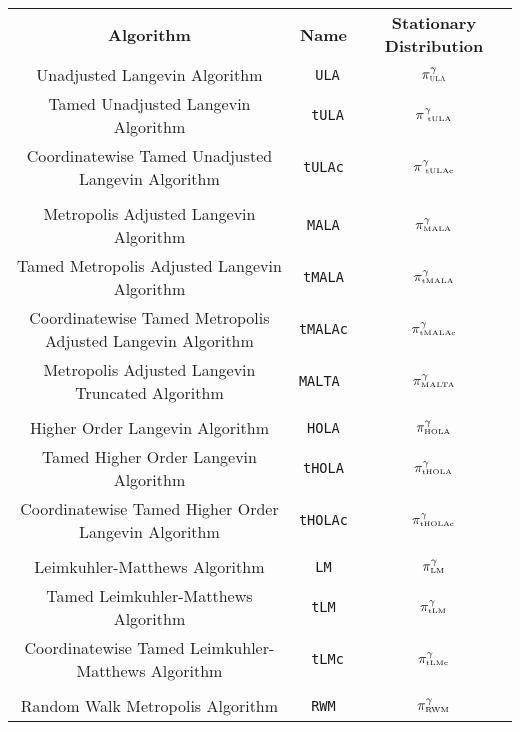 \documentclass[a4paper]{article}
\theoremstyle{definition}
\begin{document}
\bgroup
\def\arraystretch{1.25}
\begin{center}
\begin{tabular}{ccc}
	\textbf{Algorithm} & \textbf{Name} & \textbf{Stationary Distribution} \\ 
	Unadjusted Langevin Algorithm &\texttt{ ULA} & \(\pi^{\gamma}_{\text{\tiny  \sc ULA}}\)\\ 
	Tamed Unadjusted Langevin Algorithm &\texttt{ tULA} & \(\pi^{\gamma}_{\text{ \tiny   tULA}}\) \\ 
	Coordinatewise Tamed Unadjusted Langevin Algorithm & \texttt{\tiny tULAc} & \(\pi^{\gamma}_{\text{ \tiny tULAc}}\) \\ 
	&  \\ 
	Metropolis Adjusted Langevin Algorithm & \texttt{MALA} & \(\pi^{\gamma}_{\text{\tiny MALA}}\) \\ 
	Tamed Metropolis Adjusted Langevin Algorithm & \texttt{tMALA} & \(\pi^{\gamma}_{\text{\tiny tMALA}}\) \\ 
	Coordinatewise Tamed Metropolis Adjusted Langevin Algorithm & \texttt{\tiny tMALAc} & \(\pi^{\gamma}_{\text{\tiny tMALAc}}\) \\ 
	Metropolis Adjusted Langevin Truncated  Algorithm & \texttt{MALTA } & \(\pi^{\gamma}_{\text{\tiny MALTA}}\)\\ 
	&  \\ 
	Higher Order Langevin Algorithm & \texttt{HOLA} & \(\pi^{\gamma}_{\text{\tiny HOLA}}\) \\ 
	Tamed Higher Order Langevin Algorithm & \texttt{tHOLA}  & \(\pi^{\gamma}_{\text{\tiny tHOLA}}\)\\ 
	Coordinatewise Tamed Higher Order Langevin Algorithm & \texttt{tHOLAc}&  \(\pi^{\gamma}_{\text{\tiny tHOLAc}}\) \\ 
	&  \\ 
	Leimkuhler-Matthews Algorithm & \texttt{LM} & \(\pi^{\gamma}_{\text{\tiny LM}}\) \\ 
	Tamed Leimkuhler-Matthews Algorithm & \texttt{tLM} & \(\pi^{\gamma}_{\text{\tiny tLM}}\)\\ 
	Coordinatewise Tamed Leimkuhler-Matthews Algorithm & \texttt{ tLMc} & \(\pi^{\gamma}_{\text{\tiny tLMc}}\) \\ 
	&  \\ 
	Random Walk Metropolis Algorithm & \texttt{RWM} & \(\pi^{\gamma}_{\text{\tiny RWM}}\) \\ 
\end{tabular} 
\end{center}
\end{document}
